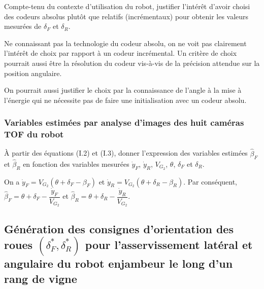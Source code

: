 \documentclass[11pt]{article}
\begin{document}
\UPSTIquestion Compte-tenu du contexte d’utilisation du robot, justifier l’intérêt d’avoir choisi des codeurs absolus
plutôt que relatifs (incrémentaux) pour obtenir les valeurs mesurées de $\delta_F$ et $\delta_R$.

\begin{UPSTIcorrige}

Ne connaissant pas la technologie du codeur absolu, on ne voit pas clairement l'intérêt de choix par rapport à un codeur incrémental. Un critère de choix pourrait aussi être la résolution du codeur vis-à-vis de la précision attendue sur la position angulaire.

On pourrait aussi justifier le choix par la connaissance de l'angle à la mise à l'énergie qui ne nécessite pas de faire une initialisation avec un codeur absolu.  
\end{UPSTIcorrige}

\subsubsection{Variables estimées par analyse d’images des huit caméras TOF du robot}

\UPSTIquestion À partir des équations (I.2) et (I.3), donner l’expression des variables estimées $\hat{\beta}_F$
et $\hat{\beta}_R$ en fonction des variables mesurées $\dot{y}_F$, $\dot{y}_R$, $V_{G_2}$, $\theta$, $\delta_F$ et $\delta_R$.

\begin{UPSTIcorrige}
On a $\dot{y}_F =V_{G_2} \left(\theta + \delta_F - \beta_F\right)$ et $\dot{y}_R =V_{G_2} \left(\theta + \delta_R - \beta_R\right)$. Par conséquent, $\hat{\beta}_F =\theta + \delta_F-\dfrac{\dot{y}_F}{V_{G_2} }  $ et $\hat{\beta}_R =\theta + \delta_R-\dfrac{\dot{y}_R}{V_{G_2} }  $.
\end{UPSTIcorrige}



\subsection{Génération des consignes d’orientation des roues $\left(\delta^*_F,\delta^*_R\right)$ pour l’asservissement latéral et angulaire du robot enjambeur le long d’un rang de vigne}
\end{document}
